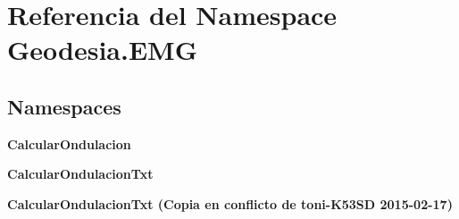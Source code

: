 \section{Referencia del Namespace Geodesia.\-E\-M\-G}
\label{namespaceGeodesia_1_1EMG}
\subsection*{Namespaces}
\begin{DoxyCompactItemize}
\item 
{\bf Calcular\-Ondulacion}
\item 
{\bf Calcular\-Ondulacion\-Txt}
\item 
{\bf Calcular\-Ondulacion\-Txt (\-Copia en conflicto de toni-\/\-K53\-S\-D 2015-\/02-\/17)}
\end{DoxyCompactItemize}
